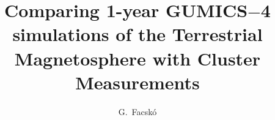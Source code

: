 \documentclass[b5paper,10pt]{article}
\begin{document}
\title{Comparing 1-year GUMICS$-$4 simulations of the Terrestrial Magnetosphere with Cluster Measurements}


\author[1]{G.~Facsk{\'o}}





\end{document}
